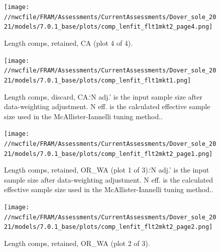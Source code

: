\documentclass[11pt,
  english,
  a4paper,
]{article}
\begin{document}
\begin{figure}
\centering
\texttt{[image: //nwcfile/FRAM/Assessments/CurrentAssessments/Dover\_sole\_2021/models/7.0.1\_base/plots/comp\_lenfit\_flt1mkt2\_page4.png]}
\caption{Length comps, retained, CA (plot 4 of 4).\label{fig:comp_lenfit_flt1mkt2_page4}}
\end{figure}

\tagmcend\tagstructend


\begin{figure}
\centering
\texttt{[image: //nwcfile/FRAM/Assessments/CurrentAssessments/Dover\_sole\_2021/models/7.0.1\_base/plots/comp\_lenfit\_flt1mkt1.png]}
\caption{Length comps, discard, CA.`N adj.' is the input sample size after data-weighting adjustment. N eff. is the calculated effective sample size used in the McAllister-Iannelli tuning method..\label{fig:comp_lenfit_flt1mkt1}}
\end{figure}

\tagmcend\tagstructend


\begin{figure}
\centering
\texttt{[image: //nwcfile/FRAM/Assessments/CurrentAssessments/Dover\_sole\_2021/models/7.0.1\_base/plots/comp\_lenfit\_flt2mkt2\_page1.png]}
\caption{Length comps, retained, OR\_WA (plot 1 of 3).`N adj.' is the input sample size after data-weighting adjustment. N eff. is the calculated effective sample size used in the McAllister-Iannelli tuning method..\label{fig:comp_lenfit_flt2mkt2_page1}}
\end{figure}

\tagmcend\tagstructend


\begin{figure}
\centering
\texttt{[image: //nwcfile/FRAM/Assessments/CurrentAssessments/Dover\_sole\_2021/models/7.0.1\_base/plots/comp\_lenfit\_flt2mkt2\_page2.png]}
\caption{Length comps, retained, OR\_WA (plot 2 of 3).\label{fig:comp_lenfit_flt2mkt2_page2}}
\end{figure}
\end{document}
